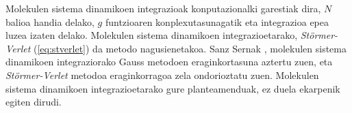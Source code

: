 Molekulen sistema dinamikoen integrazioak konputazionalki garestiak dira, $N$ balioa handia delako, $g$ funtzioaren konplexutasunagatik eta integrazioa epea luzea izaten delako. Molekulen sistema dinamikoen integrazioetarako, \emph{Störmer-Verlet} (\ref{eq:stverlet}) da metodo nagusienetakoa. Sanz Sernak \cite{sserna1996}, molekulen sistema dinamikoen integraziorako Gauss metodoen eraginkortasuna aztertu zuen, eta \emph{Störmer-Verlet} metodoa eraginkorragoa zela ondorioztatu zuen.
Molekulen sistema dinamikoen integrazioetarako gure planteamenduak, ez duela ekarpenik egiten dirudi. 



